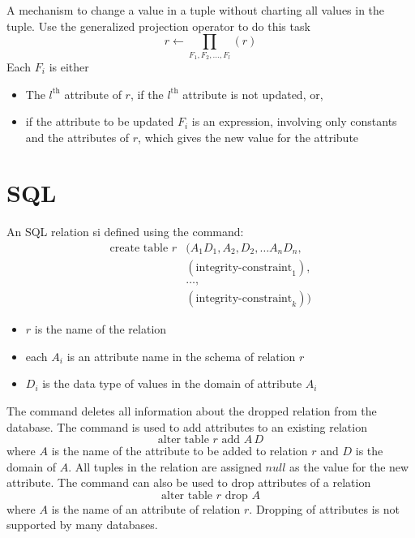 \documentclass{article}
\begin{document}
\begin{definition}[Updating]
  A mechanism to change a value in a tuple without charting all values in the tuple. Use the generalized projection operator to do this task $$r \leftarrow \prod_{F_1, F_2, \dots , F_l}(r)$$ Each $F_i$ is either 
  \begin{itemize}
    \item The $l^{\textrm{th}}$ attribute of $r$, if the $l^{\textrm{th}}$ attribute is not updated, or, 
    \item if the attribute to be updated $F_i$ is an expression, involving only constants and the attributes of $r$, which gives the new value for the attribute
  \end{itemize}
\end{definition}

\section{SQL}

An SQL relation si defined using the  command: 
\begin{align*}
  \textrm{create table } r &(A_1 D_1 , A_2 , D_2 , \dots A_n D_n , \\
  &(\textrm{integrity-constraint}_1), \\ 
  &\dots , \\ 
  &(\textrm{integrity-constraint}_k))
\end{align*}
\begin{itemize}
  \item $r$ is the name of the relation 
  \item each $A_i$ is an attribute name in the schema of relation $r$ 
  \item $D_i$ is the data type of values in the domain of attribute $A_i$
\end{itemize}

The  command deletes all information about the dropped relation from the database. The  command is used to add attributes to an existing relation $$\textrm{alter table } r \textrm{ add } A \, D$$ where $A$ is the name of the attribute to be added to relation $r$ and $D$ is the domain of $A$. All tuples in the relation are assigned $null$ as the value for the new attribute. The  command can also be used to drop attributes of a relation $$\textrm{alter table } r \textrm{ drop } A$$ where $A$ is the name of an attribute of relation $r$. Dropping of attributes is not supported by many databases. \\ 
\end{document}
